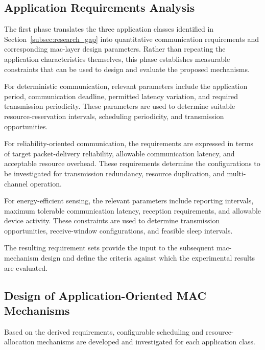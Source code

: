 \documentclass[12pt,a4paper]{article}
\begin{document}

\subsection{Application Requirements Analysis}
\label{subsec:requirements_analysis}

The first phase translates the three application classes identified in
Section~\ref{subsec:research_gap} into quantitative communication requirements
and corresponding \gls{mac}-layer design parameters. Rather than repeating the
application characteristics themselves, this phase establishes measurable
constraints that can be used to design and evaluate the proposed mechanisms.

For deterministic communication, relevant parameters include the application
period, communication deadline, permitted latency variation, and required
transmission periodicity. These parameters are used to determine suitable
resource-reservation intervals, scheduling periodicity, and transmission
opportunities.

For reliability-oriented communication, the requirements are expressed in
terms of target packet-delivery reliability, allowable communication latency,
and acceptable resource overhead. These requirements determine the
configurations to be investigated for transmission redundancy, resource
duplication, and multi-channel operation.

For energy-efficient sensing, the relevant parameters include reporting
intervals, maximum tolerable communication latency, reception requirements,
and allowable device activity. These constraints are used to determine
transmission opportunities, receive-window configurations, and feasible sleep
intervals.

The resulting requirement sets provide the input to the subsequent
\gls{mac}-mechanism design and define the criteria against which the
experimental results are evaluated.


\subsection{Design of Application-Oriented MAC Mechanisms}
\label{subsec:mac_design}

Based on the derived requirements, configurable scheduling and
resource-allocation mechanisms are developed and investigated for each
application class.
\end{document}
